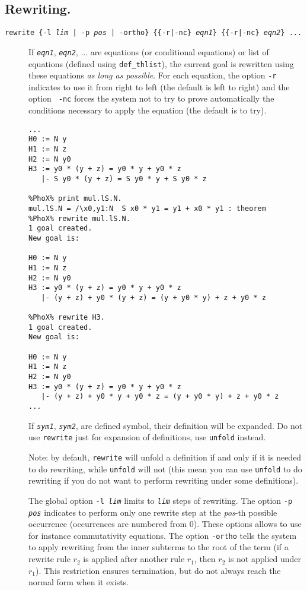 \subsection{Rewriting.}
\begin{description}

\item[\tt rewrite \{-l {\em lim} | -p {\em pos} | -ortho\} \{\{-r|-nc\}
{\em eqn1}\} \{\{-r|-nc\} {\em eqn2}\} ... 
]

If {\tt\em eqn1}, {\tt\em eqn2}, ... are equations (or conditional
equations) or list of equations (defined using {\tt def\_thlist}), the
current goal is rewritten using these equations {\em as long as
possible}. For each equation, the option {\tt -r} indicates to use it
from right to left (the default is left to right) and the option {\tt
  -nc} forces the system not to try to prove automatically the
conditions necessary to apply the equation (the default is to try).

\begin{verbatim}
...
H0 := N y
H1 := N z
H2 := N y0
H3 := y0 * (y + z) = y0 * y + y0 * z
   |- S y0 * (y + z) = S y0 * y + S y0 * z

%PhoX% print mul.lS.N.
mul.lS.N = /\x0,y1:N  S x0 * y1 = y1 + x0 * y1 : theorem
%PhoX% rewrite mul.lS.N.
1 goal created.
New goal is:

H0 := N y
H1 := N z
H2 := N y0
H3 := y0 * (y + z) = y0 * y + y0 * z
   |- (y + z) + y0 * (y + z) = (y + y0 * y) + z + y0 * z

%PhoX% rewrite H3.
1 goal created.
New goal is:

H0 := N y
H1 := N z
H2 := N y0
H3 := y0 * (y + z) = y0 * y + y0 * z
   |- (y + z) + y0 * y + y0 * z = (y + y0 * y) + z + y0 * z
...
\end{verbatim}
  
  If {\tt\em sym1}, {\tt\em sym2}, are defined symbol, their
  definition will be expanded. Do not use {\tt rewrite} just for
  expansion of definitions, use {\tt unfold} instead.

  Note: by default, {\tt rewrite} will unfold a definition if and only
  if it is needed to do rewriting, while {\tt unfold} will not (this
  mean you can use {\tt unfold} to do rewriting if you do not want to
  perform rewriting under some definitions).
 
  The global option {\tt-l {\em lim}} limits to {\tt\em lim} steps of
  rewriting. The option {\tt-p {\em pos}} indicates to perform only one
  rewrite step at the {\em pos}-th possible occurrence (occurrences are
  numbered from 0). These options allows to use for instance
  commutativity equations. The option {\tt-ortho} tells the system to
  apply rewriting from the inner subterms to the root of the term
  (if a rewrite rule $r_2$ is applied after another rule $r_1$, then
  $r_2$ is not applied under $r_1$). This restriction ensures
  termination, but do not always reach the normal form when it exists. 


\end{description}
